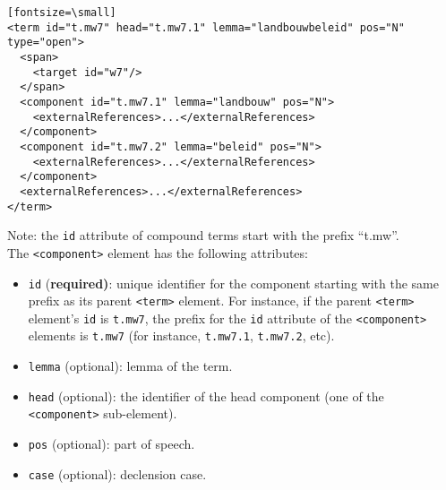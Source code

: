 \begin{verbatim}[fontsize=\small]
<term id="t.mw7" head="t.mw7.1" lemma="landbouwbeleid" pos="N" type="open">
  <span>
    <target id="w7"/>
  </span>
  <component id="t.mw7.1" lemma="landbouw" pos="N">
    <externalReferences>...</externalReferences>
  </component>
  <component id="t.mw7.2" lemma="beleid" pos="N">
    <externalReferences>...</externalReferences>
  </component>
  <externalReferences>...</externalReferences>
</term>
\end{verbatim}

Note: the \texttt{id} attribute of compound terms start with the prefix ``t.mw''.\\

The \texttt{<component>} element has the following attributes:
\begin{itemize}
\item \texttt{id} (\textbf{required)}: unique identifier for the component
  starting with the same prefix as its parent \texttt{<term>} element. For
  instance, if the parent \texttt{<term>} element's \texttt{id} is
  \texttt{t.mw7}, the prefix for the \texttt{id} attribute of the
  \texttt{<component>} elements is \texttt{t.mw7} (for instance,
  \texttt{t.mw7.1}, \texttt{t.mw7.2}, etc).
\item \texttt{lemma} (optional): lemma of the term.
\item \texttt{head} (optional): the identifier of the head component (one of
  the \texttt{<component>} sub-element).
\item \texttt{pos} (optional): part of speech.
\item \texttt{case} (optional): declension case.
\end{itemize}


